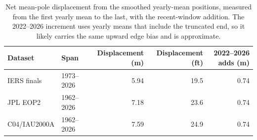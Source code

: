\documentclass[11pt,a4paper]{article}
\begin{document}
\begin{table}[ht]
\centering
\caption{Secular mean-pole drift rates per epoch with block-bootstrap intervals, from the centered smoothing. Azimuth is signed longitude, east-positive; negative values are west. The burst row is one centered half-width; the sensitivity sweep shows the estimate is unstable.}
\label{tab:rates}
\small
{}
\end{table}

\begin{table}[ht]
\centering
\caption{Net mean-pole displacement from the smoothed yearly-mean positions, measured from the first yearly mean to the last, with the recent-window addition. The 2022--2026 increment uses yearly means that include the truncated end, so it likely carries the same upward edge bias and is approximate.}
\label{tab:net}
\begin{tabular}{llrrr}
\toprule
Dataset & Span & Displacement (m) & Displacement (ft) & 2022--2026 adds (m) \\
\midrule
IERS finals & 1973--2026 & 5.94 & 19.5 & 0.74 \\
JPL EOP2 & 1962--2026 & 7.18 & 23.6 & 0.74 \\
C04/IAU2000A & 1962--2026 & 7.59 & 24.9 & 0.74 \\
\bottomrule
\end{tabular}
\end{table}
\end{document}
